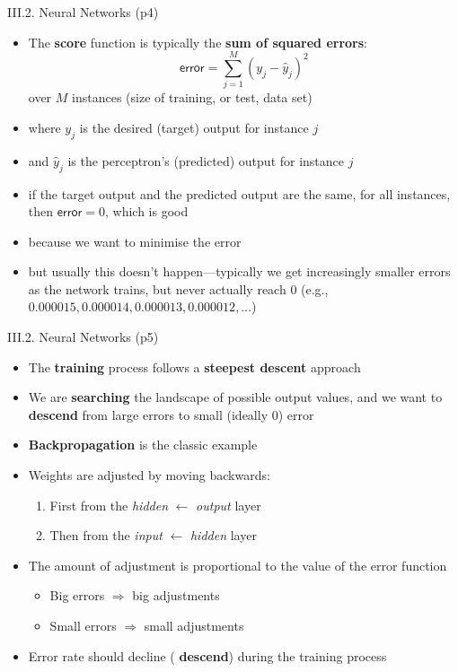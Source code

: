 \documentclass[handout]{beamer}
\newcommand{\strong}[1]{\textbf{\color{teal} #1}}
\newcommand{\stronger}[1]{\textbf{\color{purple} #1}}
\begin{document}
\begin{frame}{III.2. Neural Networks (p4)}
\begin{itemize}
\item The \stronger{score} function is typically the \strong{sum of squared errors}:
\[
\mathsf{error} = \sum_{j=1}^{M}{( y_j - \hat{y}_j )^2}
\]
over $M$ instances (size of training, or test, data set)
\item[] where $y_j$ is the desired (target) output for instance $j$
\item[] and $\hat{y}_j$ is the perceptron's (predicted) output for instance $j$
\item if the target output and the predicted output are the same, for all instances, then 
$\mathsf{error}=0$, which is good
\item because we want to minimise the error
\item but usually this doesn't happen---typically we get increasingly smaller errors as the network trains, but never actually reach $0$
(e.g., $0.000015, 0.000014, 0.000013, 0.000012, \ldots$)
\end{itemize}
\end{frame}
\begin{frame}{III.2. Neural Networks (p5)}
\begin{itemize}
\item The \strong{training} process follows a \strong{steepest descent} approach
\item We are \strong{searching} the landscape of possible output values, and we want to \strong{descend} from large errors to small (ideally $0$) error
\item \stronger{Backpropagation} is the classic example
\item Weights are adjusted by moving backwards:
	\begin{enumerate}
	\item First from the \emph{hidden} $\leftarrow$ \emph{output} layer
	\item Then from the \emph{input} $\leftarrow$ \emph{hidden} layer
	\end{enumerate}
\item The amount of adjustment is proportional to the value of the error function
	\begin{itemize}
	\item Big errors $\Rightarrow$ big adjustments
	\item Small errors $\Rightarrow$ small adjustments
	\end{itemize}
\item Error rate should decline (\strong{descend}) during the training process
\end{itemize}
\end{frame}
\end{document}
